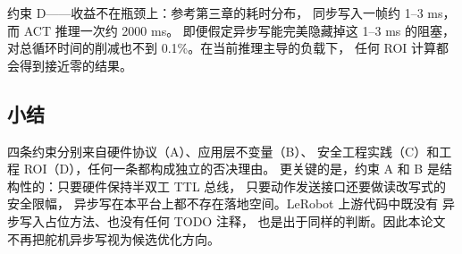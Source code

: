 约束 D——收益不在瓶颈上：参考第三章的耗时分布，
同步写入一帧约 1--3 ms，而 ACT 推理一次约 2000 ms。
即便假定异步写能完美隐藏掉这 1--3 ms 的阻塞，
对总循环时间的削减也不到 0.1\%。在当前推理主导的负载下，
任何 ROI 计算都会得到接近零的结果。

\subsection{小结}\label{sec:async-write-conclusion}

四条约束分别来自硬件协议（A）、应用层不变量（B）、
安全工程实践（C）和工程 ROI（D），任何一条都构成独立的否决理由。
更关键的是，约束 A 和 B 是结构性的：只要硬件保持半双工 TTL 总线，
只要动作发送接口还要做读改写式的安全限幅，
异步写在本平台上都不存在落地空间。LeRobot 上游代码中既没有
异步写入占位方法、也没有任何 TODO 注释，
也是出于同样的判断。因此本论文不再把舵机异步写视为候选优化方向。
